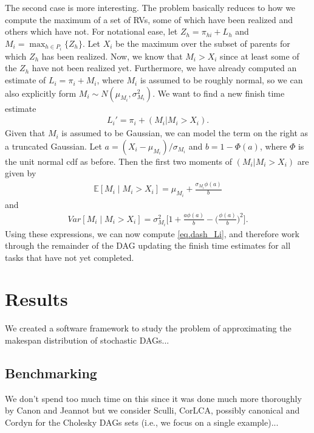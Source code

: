 \documentclass[12pt]{article}
\def\E{\mathbb{E}}
\begin{document}
The second case is more interesting. The problem basically reduces to how we compute the maximum of a set of RVs, some of which have been realized and others which have not. For notational ease, let $Z_h = \pi_{hi} + L_h$ and $M_i = \max_{h \in P_i} \{ Z_h  \}$.  Let $X_i$ be the maximum over the subset of parents for which $Z_h$ has been realized. Now, we know that $M_i > X_i$ since at least some of the $Z_h$ have not been realized yet. Furthermore, we have already computed an estimate of $L_i = \pi_i + M_i$, where $M_i$ is assumed to be roughly normal, so we can also explicitly form $M_i \sim N(\mu_{M_i}, \sigma_{M_i}^2)$. We want to find a new finish time estimate
\begin{align}
  \label{eq.dash_Li}
  L_i' = \pi_i + (M_i | M_i > X_i). 
\end{align}
Given that $M_i$ is assumed to be Gaussian, we can model the term on the right as a truncated Gaussian. Let $a = (X_i - \mu_{M_i}) / \sigma_{M_i}$ and $b = 1 - \Phi(a)$, where $\Phi$ is the unit normal cdf as before. Then the first two moments of $(M_i | M_i > X_i)$ are given by
\begin{align*}
  \E[M_i \mid M_i > X_i] = \mu_{M_i} + \frac{\sigma_{M_i}\phi(a)}{b}
\end{align*}
and
\begin{align*}
  Var[M_i \mid M_i > X_i] = \sigma_{M_i}^2 \bigg[ 1 + \frac{a\phi(a)}{b} - \bigg( \frac{\phi(a)}{b} \bigg)^2    \bigg].
\end{align*}
Using these expressions, we can now compute \eqref{eq.dash_Li}, and therefore work through the remainder of the DAG updating the finish time estimates for all tasks that have not yet completed. 




\section{Results}
\label{sect.results}


We created a software framework to study the problem of approximating the makespan distribution of stochastic DAGs...

\subsection{Benchmarking}
\label{subsect.benchmarking}

We don't spend too much time on this since it was done much more thoroughly by Canon and Jeannot but we consider Sculli, CorLCA, possibly canonical and Cordyn for the Cholesky DAGs sets (i.e., we focus on a single example)...
\end{document}
